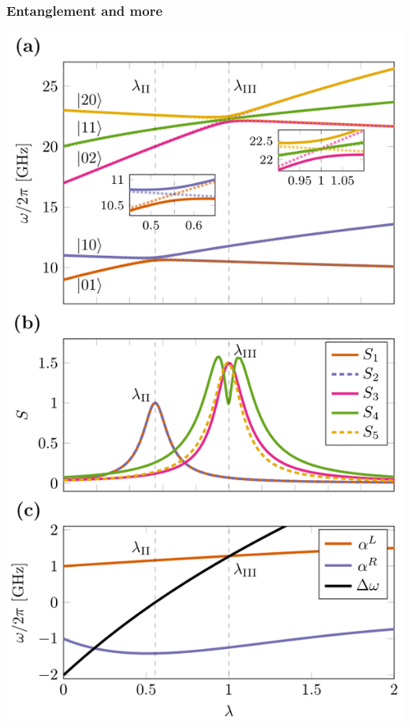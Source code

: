 \documentclass{beamer}
\begin{document}
\begin{frame}
\frametitle{Entanglement and more}

\vspace{6mm}

\centerline{\includegraphics[width=0.7\linewidth]{qcfigures/crossings-entropies-anharmonicities-1.png}}

\vspace{6mm}
\end{frame}
\end{document}
